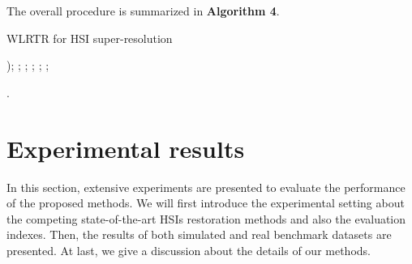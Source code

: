\documentclass[twocolumn]{svjour3}          %
\begin{document}
    The overall procedure is summarized in \textbf{Algorithm 4}.

\begin{algorithm}[tbp]
\caption{WLRTR for HSI super-resolution}
     \begin{algorithmic}[1]\label{alg:algo4}
);
           ;
           ;
           ;
                   ;
                \EndFor
           ;
          \EndFor
          \EndProcedure
     \end{algorithmic}
.
\end{algorithm}


\section{Experimental results}
    In this section, extensive experiments are presented to evaluate the performance of the proposed methods. We will first introduce the experimental setting about the competing state-of-the-art HSIs restoration methods and also the evaluation indexes. Then, the results of both simulated and real benchmark datasets are presented. At last, we give a discussion about the details of our methods.
\end{document}
